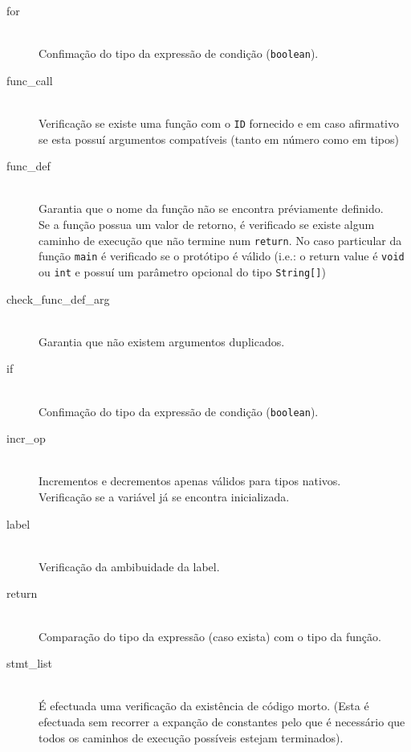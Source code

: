 \documentclass[a4paper]{article}
\begin{document}
\begin{description}
	\item [for] \hfill \\
		Confimação do tipo da expressão de condição (\texttt{boolean}).

	\item [func\_call] \hfill \\
		Verificação se existe uma função com o \texttt{ID} fornecido e em caso afirmativo se esta possuí argumentos compatíveis
		(tanto em número como em tipos)
		
	\item [func\_def] \hfill \\
		Garantia que o nome da função não se encontra préviamente definido. \\
		Se a função possua um valor de retorno, é verificado se existe algum caminho de execução que não termine num \texttt{return}.
		No caso particular da função \texttt{main} é verificado se o protótipo é válido
		(i.e.: o return value é \texttt{void} ou \texttt{int} e possuí um parâmetro opcional do tipo \texttt{String[]})
		
	\item [check\_func\_def\_arg] \hfill \\
		Garantia que não existem argumentos duplicados.

	\item [if] \hfill \\
		Confimação do tipo da expressão de condição (\texttt{boolean}).

	\item [incr\_op] \hfill \\
		Incrementos e decrementos apenas válidos para tipos nativos. \\
		Verificação se a variável já se encontra inicializada.

	\item [label] \hfill \\
		Verificação da ambibuidade da label.

	\item [return] \hfill \\
		Comparação do tipo da expressão (caso exista) com o tipo da função.

	\item [stmt\_list] \hfill \\
		É efectuada uma verificação da existência de código morto. (Esta é efectuada sem recorrer a expanção
		de constantes pelo que é necessário que todos os caminhos de execução possíveis estejam terminados).


\end{description}
\end{document}
